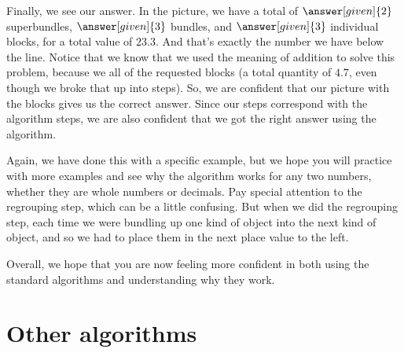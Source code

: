 \documentclass{ximera}
\begin{document}
\begin{example}
\begin{image}
\end{image}

Finally, we see our answer. In the picture, we have a total of $\answer[given]{2}$ superbundles, $\answer[given]{3}$ bundles, and $\answer[given]{3}$ individual blocks, for a total value of $23.3$. And that's exactly the number we have below the line. Notice that we know that we used the meaning of addition to solve this problem, because we  all of the requested blocks (a total quantity of $4.7$, even though we broke that up into steps). So, we are confident that our picture with the blocks gives us the correct answer. Since our steps correspond with the algorithm steps, we are also confident that we got the right answer using the algorithm.


\end{example}

Again, we have done this with a specific example, but we hope you will practice with more examples and see why the algorithm works for any two numbers, whether they are whole numbers or decimals. Pay special attention to the regrouping step, which can be a little confusing. But when we did the regrouping step, each time we were bundling up one kind of object into the next kind of object, and so we had to place them in the next place value to the left.

Overall, we hope that you are now feeling more confident in both using the standard algorithms and understanding why they work.





\section{Other algorithms}
\end{document}
